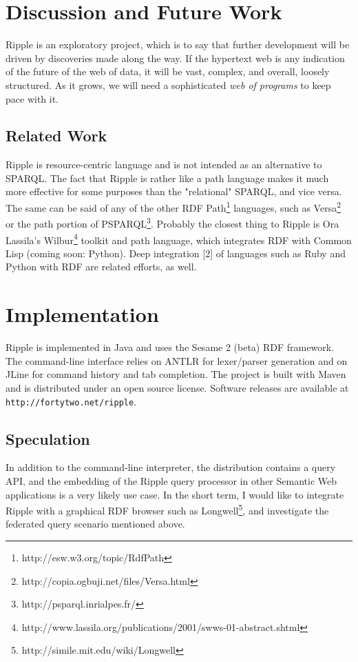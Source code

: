 \documentclass[runningheads]{llncs}
\begin{document}
\section{Discussion and Future Work}
Ripple is an exploratory project, which is to say that further development will be driven by discoveries made along the way.  If the hypertext web is any indication of the future of the web of data, it will be vast, complex, and overall, loosely structured.  As it grows, we will need a sophisticated \textit{web of programs} to keep pace with it.

\subsection{Related Work}
Ripple is resource-centric language and is not intended as an alternative to SPARQL.  The fact that Ripple is rather like a path language makes it much more effective for some purposes than the "relational" SPARQL, and vice versa.  The same can be said of any of the other RDF Path\footnote{http://esw.w3.org/topic/RdfPath} languages, such as Versa\footnote{http://copia.ogbuji.net/files/Versa.html} or the path portion of PSPARQL\footnote{http://psparql.inrialpes.fr/}.  Probably the closest thing to Ripple is Ora Lassila's Wilbur\footnote{http://www.lassila.org/publications/2001/swws-01-abstract.shtml} toolkit and path language, which integrates RDF with Common Lisp (coming soon: Python).  Deep integration [2] of languages such as Ruby and Python with RDF are related efforts, as well.


\section{Implementation}
Ripple is implemented in Java and uses the Sesame 2 (beta) RDF framework.  The command-line interface relies on ANTLR for lexer/parser generation and on JLine for command history and tab completion.  The project is built with Maven and is distributed under an open source license.  Software releases are available at \texttt{http://fortytwo.net/ripple}.

\subsection{Speculation}

In addition to the command-line interpreter, the distribution contains a query API, and the embedding of the Ripple query processor in other Semantic Web applications is a very likely use case.  In the short term, I would like to integrate Ripple with a graphical RDF browser such as Longwell\footnote{http://simile.mit.edu/wiki/Longwell}, and investigate the federated query scenario mentioned above.  
\end{document}

